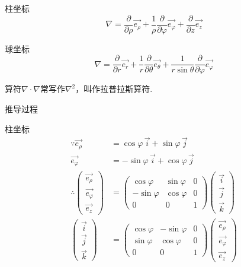 \documentclass[12pt, UTF8, AutoFakeBold]{ctexart} %
\begin{document}
柱坐标
\[
    \nabla = \frac{\partial}{\partial \rho}\vec{e_\rho}
    + \frac{1}{\rho} \frac{\partial}{\partial\varphi}\vec{e_\varphi}
    + \frac{\partial}{\partial z}\vec{e_z}
\]

球坐标
\[
    \nabla = \frac{\partial}{\partial r}\vec{e_r}
    + \frac{1}{r} \frac{\partial}{\partial \theta}\vec{e_\theta}
    + \frac{1}{r \sin\theta} \frac{\partial}{\partial \varphi}\vec{e_\varphi}
\]

算符$\nabla\cdot\nabla$常写作$\nabla^2$，叫作拉普拉斯算符.

\bigskip
\noindent 推导过程

柱坐标
\allowdisplaybreaks
\begin{align*}
    \because
    \vec{e_\rho} &= \cos\varphi\,\vec{i} + \sin\varphi\,\vec{j}\\
    \vec{e_\varphi} &= -\sin\varphi\,\vec{i} + \cos\varphi\,\vec{j}\\
    \therefore
    \begin{pmatrix}
        \vec{e_\rho}\\
        \vec{e_\varphi}\\
        \vec{e_z}
    \end{pmatrix}
    &=
    \begin{pmatrix}
        \cos\varphi & \sin\varphi & 0\\
        -\sin\varphi & \cos\varphi & 0\\
        0 & 0 & 1
    \end{pmatrix}
    \begin{pmatrix}
        \vec{i}\\
        \vec{j}\\
        \vec{k}
    \end{pmatrix}\\
    \begin{pmatrix}
        \vec{i}\\
        \vec{j}\\
        \vec{k}
    \end{pmatrix}
    &=
    \begin{pmatrix}
        \cos\varphi & -\sin\varphi & 0\\
        \sin\varphi & \cos\varphi & 0\\
        0 & 0 & 1
    \end{pmatrix}
    \begin{pmatrix}
        \vec{e_\rho}\\
        \vec{e_\varphi}\\
        \vec{e_z}
    \end{pmatrix}\\

\end{align*}
\end{document}
